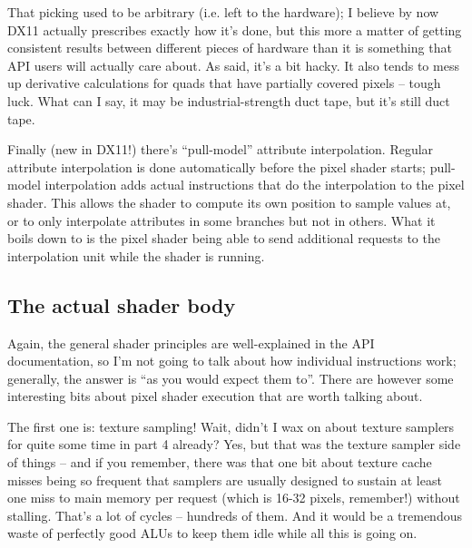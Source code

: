 \documentclass[12pt]{article}
\begin{document}
That picking used to be arbitrary (i.e. left to the hardware); I believe by now DX11 actually prescribes exactly how it’s done, but this more a matter of getting consistent results between different pieces of hardware than it is something that API users will actually care about. As said, it’s a bit hacky. It also tends to mess up derivative calculations for quads that have partially covered pixels – tough luck. What can I say, it may be industrial-strength duct tape, but it’s still duct tape.

Finally (new in DX11!) there’s “pull-model” attribute interpolation. Regular attribute interpolation is done automatically before the pixel shader starts; pull-model interpolation adds actual instructions that do the interpolation to the pixel shader. This allows the shader to compute its own position to sample values at, or to only interpolate attributes in some branches but not in others. What it boils down to is the pixel shader being able to send additional requests to the interpolation unit while the shader is running.

\subsection{The actual shader body}
\label{sec:orgf661441}

Again, the general shader principles are well-explained in the API documentation, so I’m not going to talk about how individual instructions work; generally, the answer is “as you would expect them to”. There are however some interesting bits about pixel shader execution that are worth talking about.

The first one is: texture sampling! Wait, didn’t I wax on about texture samplers for quite some time in part 4 already? Yes, but that was the texture sampler side of things – and if you remember, there was that one bit about texture cache misses being so frequent that samplers are usually designed to sustain at least one miss to main memory per request (which is 16-32 pixels, remember!) without stalling. That’s a lot of cycles – hundreds of them. And it would be a tremendous waste of perfectly good ALUs to keep them idle while all this is going on.
\end{document}
